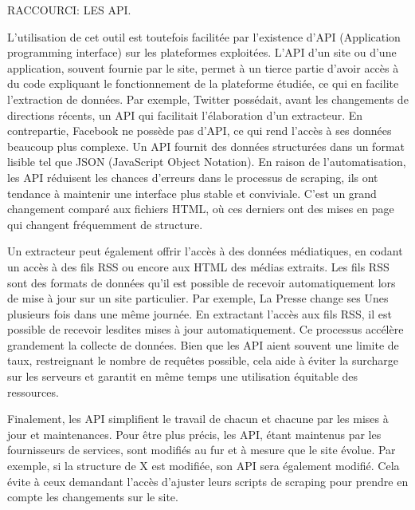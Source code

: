 \documentclass[
  letterpaper,
  DIV=11,
  numbers=noendperiod]{scrreprt}
\begin{document}
RACCOURCI: LES API.

L'utilisation de cet outil est toutefois facilitée par l'existence d'API
(Application programming interface) sur les plateformes exploitées.
L'API d'un site ou d'une application, souvent fournie par le site,
permet à un tierce partie d'avoir accès à du code expliquant le
fonctionnement de la plateforme étudiée, ce qui en facilite l'extraction
de données. Par exemple, Twitter possédait, avant les changements de
directions récents, un API qui facilitait l'élaboration d'un extracteur.
En contrepartie, Facebook ne possède pas d'API, ce qui rend l'accès à
ses données beaucoup plus complexe. Un API fournit des données
structurées dans un format lisible tel que JSON (JavaScript Object
Notation). En raison de l'automatisation, les API réduisent les chances
d'erreurs dans le processus de scraping, ils ont tendance à maintenir
une interface plus stable et conviviale. C'est un grand changement
comparé aux fichiers HTML, où ces derniers ont des mises en page qui
changent fréquemment de structure.

Un extracteur peut également offrir l'accès à des données médiatiques,
en codant un accès à des fils RSS ou encore aux HTML des médias
extraits. Les fils RSS sont des formats de données qu'il est possible de
recevoir automatiquement lors de mise à jour sur un site particulier.
Par exemple, La Presse change ses Unes plusieurs fois dans une même
journée. En extractant l'accès aux fils RSS, il est possible de recevoir
lesdites mises à jour automatiquement. Ce processus accélère grandement
la collecte de données. Bien que les API aient souvent une limite de
taux, restreignant le nombre de requêtes possible, cela aide à éviter la
surcharge sur les serveurs et garantit en même temps une utilisation
équitable des ressources.

Finalement, les API simplifient le travail de chacun et chacune par les
mises à jour et maintenances. Pour être plus précis, les API, étant
maintenus par les fournisseurs de services, sont modifiés au fur et à
mesure que le site évolue. Par exemple, si la structure de X est
modifiée, son API sera également modifié. Cela évite à ceux demandant
l'accès d'ajuster leurs scripts de scraping pour prendre en compte les
changements sur le site.
\end{document}
